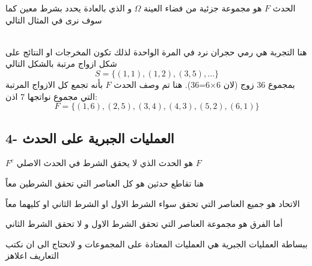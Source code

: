\begin{definition}
	الحدث \(F\) هو مجموعة جزئية من فضاء العينة \(\Omega\) و الذي بالعادة يحدد بشرط معين كما سوف نرى في المثال التالي  
\end{definition}

\begin{example}
    \\
	هنا التجربة هي رمي حجران نرد في المرة الواحدة لذلك تكون المخرجات او النتائج على شكل ازواج مرتبة بالشكل التالي 
	\[
	S = \{(1,1), (1,2), (3,5), \dots\}
	\]
	بمجموع 36 زوج (لان 6$\times$6=36). هنا تم وصف الحدث \(F\) بأنه تجمع كل الازواج المرتبة التي مجموع نواتجها 7 اذن:
	\[
	F = \{(1,6), (2,5), (3,4), (4,3), (5,2) , (6,1)\}
	\]
\end{example}

\subsection*{4- العمليات الجبرية على الحدث}

\begin{flushleft}
\end{flushleft}
\(F^c\) هو الحدث الذي لا يحقق الشرط في الحدث الاصلي \(F\)
\begin{flushleft}
\end{flushleft}
هنا تقاطع حدثين هو كل العناصر التي تحقق الشرطين معاً
\begin{flushleft}
\end{flushleft}
الاتحاد هو جميع العناصر التي تحقق سواء الشرط الاول او الشرط الثاني او كليهما معاً
\begin{flushleft}
\end{flushleft}
أما الفرق هو مجموعة العناصر التي تحقق الشرط الاول و لا تحقق الشرط الثاني 

\begin{note}
	ببساطة العمليات الجبرية هي العمليات المعتادة على المجموعات و لانحتاج الى ان نكتب التعاريف اعلاهز
\end{note}

